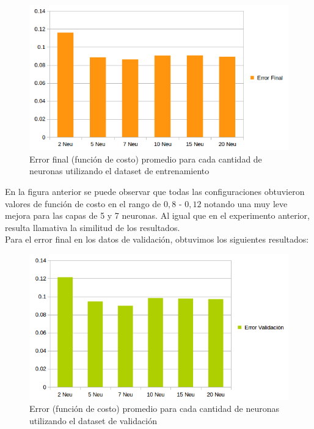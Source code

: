 \begin{figure}[h]
  \begin{center}
  \includegraphics[scale=0.70]{graficos/ej2_cant_neuro_error_final.png}
  \caption{Error final (función de costo) promedio para cada cantidad de neuronas utilizando el dataset de entrenamiento}
  \end{center}
\end{figure}

En la figura anterior se puede observar que todas las configuraciones obtuvieron valores de función de costo en el rango de $0,8$ - $0,12$ notando una muy leve mejora para las capas de 5 y 7 neuronas. Al igual que en el experimento anterior, resulta llamativa la similitud de los resultados. \\

Para el error final en los datos de validación, obtuvimos los siguientes resultados:\\

\begin{figure}[h]
  \begin{center}
  \includegraphics[scale=0.70]{graficos/ej2_cant_neuro_error_valid.png}
  \caption{Error (función de costo) promedio para cada cantidad de neuronas utilizando el dataset de validación}
  \end{center}
\end{figure}

